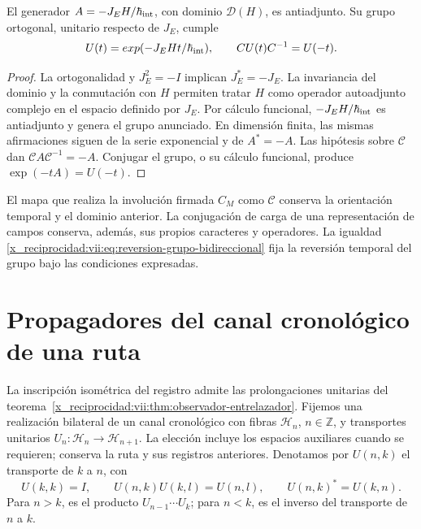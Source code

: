 \begin{theorem}
\label{x_reciprocidad:vii:thm:reversion-evolucion}
El generador \(A=-J_EH/\hbar_{\rm int}\), con dominio \(\mathcal D(H)\),
es antiadjunto. Su grupo ortogonal, unitario respecto de \(J_E\), cumple
\begin{equation}
 U(t)=\exp(-J_EHt/\hbar_{\rm int}),\qquad
 \mathcal C U(t)\mathcal C^{-1}=U(-t).
 \label{x_reciprocidad:vii:eq:reversion-grupo-bidireccional}
\end{equation}
\end{theorem}
\begin{proof}
La ortogonalidad y \(J_E^2=-I\) implican \(J_E^*=-J_E\).
La invariancia del dominio y la conmutación con \(H\) permiten tratar
\(H\) como operador autoadjunto complejo en el espacio definido por
\(J_E\). Por cálculo funcional, \(-J_EH/\hbar_{\rm int}\) es
antiadjunto y genera el grupo anunciado. En dimensión finita, las mismas
afirmaciones siguen de la serie exponencial y de \(A^*=-A\).
Las hipótesis sobre \(\mathcal C\) dan
\(\mathcal C A\mathcal C^{-1}=-A\). Conjugar el grupo, o su cálculo
funcional, produce \(\exp(-tA)=U(-t)\).
\end{proof}

El mapa que realiza la involución firmada \(C_M\) como \(\mathcal C\)
conserva la orientación temporal y el dominio anterior. La conjugación de
carga de una representación de campos conserva, además, sus propios
caracteres y operadores. La igualdad
\eqref{x_reciprocidad:vii:eq:reversion-grupo-bidireccional} fija la reversión temporal
del grupo bajo las condiciones expresadas.

\section{Propagadores del canal cronológico de una ruta}
\label{x_reciprocidad:vii:subsec:green-cronologico}

La inscripción isométrica del registro admite las prolongaciones unitarias
del teorema~\ref{x_reciprocidad:vii:thm:observador-entrelazador}. Fijemos una realización
bilateral de un canal cronológico con fibras \(\mathcal H_n\),
\(n\in\mathbb Z\), y transportes unitarios
\(U_n:\mathcal H_n\to\mathcal H_{n+1}\).
La elección incluye los espacios auxiliares cuando se requieren; conserva
la ruta y sus registros anteriores. Denotamos por \(U(n,k)\) el transporte
de \(k\) a \(n\), con
\[
 U(k,k)=I,\qquad U(n,k)U(k,l)=U(n,l),\qquad
 U(n,k)^*=U(k,n).
\]
Para \(n>k\), es el producto \(U_{n-1}\cdots U_k\); para \(n<k\),
es el inverso del transporte de \(n\) a \(k\).

